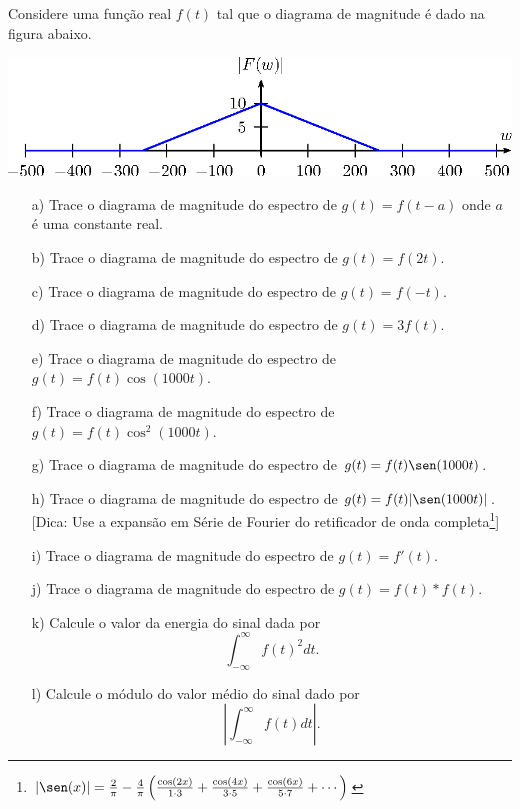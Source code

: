 \begin{exer}Considere uma função real $f(t)$ tal que o diagrama de magnitude é dado na figura abaixo. 
\begin{center}
\includegraphics{cap_propriedades_transformada/pics/figura_13}\end{center}
\begin{itemize}
\item[a)] Trace o diagrama de magnitude do espectro de $g(t)=f(t-a)$ onde $a$ é uma constante real.
\item[b)] Trace o diagrama de magnitude do espectro de $g(t)=f(2t)$.
\item[c)] Trace o diagrama de magnitude do espectro de $g(t)=f(-t)$.
\item[d)] Trace o diagrama de magnitude do espectro de $g(t)=3f(t)$.
\item[e)] Trace o diagrama de magnitude do espectro de $g(t)=f(t)\cos(1000t)$.
\item[f)] Trace o diagrama de magnitude do espectro de $g(t)=f(t)\cos^2(1000t)$.
\item[g)] Trace o diagrama de magnitude do espectro de $g(t)=f(t)\sen(1000t)$.
\item[h)] Trace o diagrama de magnitude do espectro de $g(t)=f(t)|\sen(1000t)|$. [Dica: Use a expansão em Série de Fourier do retificador de onda completa\footnote{$|\sen(x)|=\frac{2}{\pi}-\frac{4}{\pi}\left(\frac{\cos(2x)}{1\cdot 3}+\frac{\cos(4x)}{3\cdot 5}+\frac{\cos(6x)}{5\cdot 7}+\cdots\right)$}]
\item[i)] Trace o diagrama de magnitude do espectro de $g(t)=f'(t)$.
\item[j)] Trace o diagrama de magnitude do espectro de $g(t)=f(t)\ast f(t)$.
\item[k)] Calcule o valor da energia do sinal dada por \begin{equation}\int_{-\infty}^\infty f(t)^2dt.\end{equation}
\item[l)] Calcule o módulo do valor médio do sinal dado por \begin{equation}\left|\int_{-\infty}^\infty f(t)dt\right|.\end{equation}
\end{itemize}
 \end{exer}
